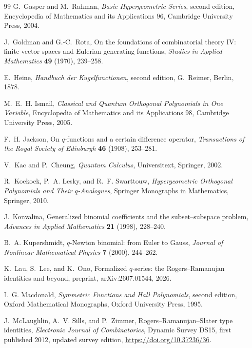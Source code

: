 \documentclass[11pt,a4paper,oneside,openany]{book}
\theoremstyle{definition}
\theoremstyle{remark}
\begin{document}
\begin{thebibliography}{99}
G.~Gasper and M.~Rahman,
\emph{Basic Hypergeometric Series}, second edition,
Encyclopedia of Mathematics and its Applications 96, Cambridge University Press, 2004.

J.~Goldman and G.-C.~Rota,
On the foundations of combinatorial theory IV: finite vector spaces and Eulerian generating functions,
\emph{Studies in Applied Mathematics} \textbf{49} (1970), 239--258.

E.~Heine,
\emph{Handbuch der Kugelfunctionen}, second edition,
G.~Reimer, Berlin, 1878.

M.~E.~H. Ismail,
\emph{Classical and Quantum Orthogonal Polynomials in One Variable},
Encyclopedia of Mathematics and its Applications 98, Cambridge University Press, 2005.

F.~H. Jackson,
On $q$-functions and a certain difference operator,
\emph{Transactions of the Royal Society of Edinburgh} \textbf{46} (1908), 253--281.

V.~Kac and P.~Cheung,
\emph{Quantum Calculus},
Universitext, Springer, 2002.

R.~Koekoek, P.~A. Lesky, and R.~F. Swarttouw,
\emph{Hypergeometric Orthogonal Polynomials and Their $q$-Analogues},
Springer Monographs in Mathematics, Springer, 2010.

J.~Konvalina,
Generalized binomial coefficients and the subset--subspace problem,
\emph{Advances in Applied Mathematics} \textbf{21} (1998), 228--240.

B.~A. Kupershmidt,
$q$-Newton binomial: from Euler to Gauss,
\emph{Journal of Nonlinear Mathematical Physics} \textbf{7} (2000), 244--262.

K.~Lau, S.~Lee, and K.~Ono,
Formalized $q$-series: the Rogers--Ramanujan identities and beyond,
preprint, arXiv:2607.01544, 2026.

I.~G. Macdonald,
\emph{Symmetric Functions and Hall Polynomials}, second edition,
Oxford Mathematical Monographs, Oxford University Press, 1995.

J.~McLaughlin, A.~V. Sills, and P.~Zimmer,
Rogers--Ramanujan--Slater type identities,
\emph{Electronic Journal of Combinatorics}, Dynamic Survey DS15,
first published 2012, updated survey edition,
\url{https://doi.org/10.37236/36}.


\end{thebibliography}
\end{document}
